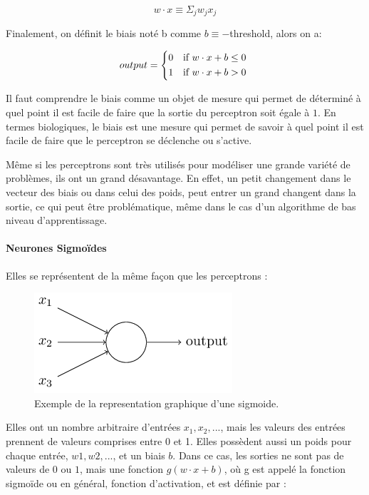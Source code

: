 \documentclass[conference,onecolumn]{IEEEtran}
\begin{document}
\begin{equation}
    w \cdot x \equiv \Sigma_j w_jx_j
\end{equation}

Finalement, on définit le biais noté b comme $b \equiv -$threshold, alors on a: 

\begin{equation}
    output =
    \begin{cases*}
      0 & if $w \cdot x + b \leq 0$ \\
      1 & if $w \cdot x + b > 0$ \\
    \end{cases*}
\end{equation}

Il faut comprendre le biais comme un objet de mesure qui permet de déterminé à quel point il est facile de faire que la sortie du perceptron soit égale à $1$. En termes biologiques, le biais est une mesure qui permet de savoir à quel point il est facile de faire que le perceptron se déclenche ou s’active. 

Même si les perceptrons sont très utilisés pour modéliser une grande variété de problèmes, ils ont un grand désavantage. En effet, un petit changement dans le vecteur des biais ou dans celui des poids, peut entrer un grand changent dans la sortie, ce qui peut être problématique, même dans le cas d’un algorithme de bas niveau d’apprentissage.
\hfill\\

\paragraph{Neurones Sigmoïdes}
Elles se représentent de la même façon que les perceptrons : 

 \begin{figure}[H]
 \centering
    \includegraphics[scale=0.5]{img9.png}
    \caption{Exemple de la representation graphique d’une sigmoide.}
\end{figure}

Elles ont un nombre arbitraire d’entrées $x_1, x_2, ...$, mais les valeurs des entrées prennent de valeurs comprises entre 0 et 1. Elles possèdent aussi un poids pour chaque entrée, $w1, w2, ...$, et un biais $b$. Dans ce cas, les sorties ne sont pas de valeurs de $0$ ou $1$, mais une fonction $g(w\cdot x+b)$, où g est appelé la fonction sigmoïde ou en général, fonction d’activation, et est définie par : 
\end{document}
